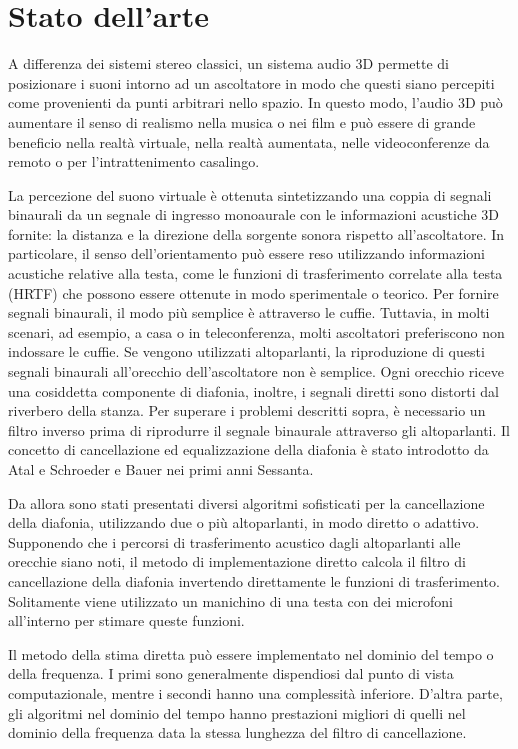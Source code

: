 \documentclass[12pt,a4paper,titlepage]{article}
\begin{document}
\section{Stato dell'arte}
\label{sec:Stato_arte}    

A differenza dei sistemi stereo classici, un sistema audio 3D permette di posizionare i suoni intorno ad un ascoltatore in modo che questi siano percepiti come provenienti da punti arbitrari nello spazio. In questo modo, l'audio 3D può  aumentare il senso di realismo nella musica o nei film e può essere di grande beneficio nella realtà virtuale, nella realtà aumentata, nelle videoconferenze da remoto o per l'intrattenimento casalingo.

La percezione del suono virtuale è ottenuta sintetizzando una coppia di segnali binaurali da un segnale di ingresso monoaurale con le informazioni acustiche 3D fornite: la distanza e la direzione della sorgente sonora rispetto all'ascoltatore. In particolare, il senso dell'orientamento può essere reso utilizzando informazioni acustiche relative alla testa, come le funzioni di trasferimento correlate alla testa (HRTF) che possono essere ottenute in modo sperimentale o teorico. Per fornire segnali binaurali, il modo più semplice è attraverso le cuffie. Tuttavia, in molti scenari, ad esempio, a casa o in teleconferenza, molti ascoltatori preferiscono non indossare le cuffie. Se vengono utilizzati altoparlanti, la riproduzione di questi segnali binaurali all'orecchio dell'ascoltatore non è semplice. Ogni orecchio riceve una cosiddetta componente di diafonia, inoltre, i segnali diretti sono distorti dal riverbero della stanza. Per superare i problemi descritti sopra, è necessario un filtro inverso prima di riprodurre il segnale binaurale attraverso gli altoparlanti. Il concetto di cancellazione ed equalizzazione della diafonia è stato introdotto da Atal e Schroeder e Bauer nei primi anni Sessanta.

Da allora sono stati presentati diversi algoritmi sofisticati per la cancellazione della diafonia, utilizzando due o più altoparlanti, in modo diretto o adattivo. Supponendo che i percorsi di trasferimento acustico dagli altoparlanti alle orecchie siano noti, il metodo di implementazione diretto calcola il filtro di cancellazione della diafonia invertendo direttamente le funzioni di trasferimento. Solitamente viene utilizzato un manichino di una testa con dei microfoni all'interno per stimare queste funzioni.

Il metodo della stima diretta può essere implementato nel dominio del tempo o della frequenza. I primi sono generalmente dispendiosi dal punto di vista computazionale, mentre i secondi hanno una complessità inferiore. D'altra parte, gli algoritmi nel dominio del tempo hanno prestazioni migliori di quelli nel dominio della frequenza data la stessa lunghezza del filtro di cancellazione.
\end{document}
